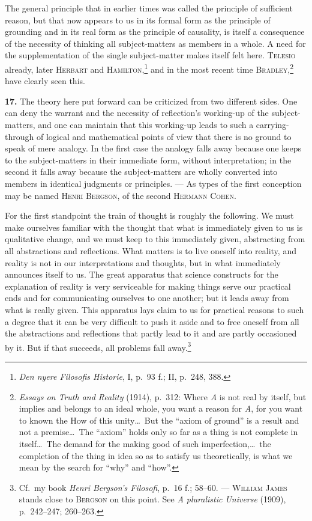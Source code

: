 \documentclass[12pt]{book}
\newcommand{\hnum}[1]{\textbf{#1.}\enspace}
\newcommand{\opage}[1]{\marginnote{\footnotesize\textit{[#1]}}}
\begin{document}
The general principle that in earlier times was called the principle of sufficient
reason, but that now appears to us in its formal form as the principle of
grounding and in its real form as the principle of causality, is itself a
consequence of the necessity of thinking all subject-matters as members in a
whole. A need for the supplementation of the single subject-matter makes itself
felt here. \textsc{Telesio} already, later \textsc{Herbart} and
\textsc{Hamilton},\footnote{\textit{Den nyere Filosofis Historie}, I, p.\ 93 f.;
II, p.\ 248, 388.} and in the most recent time
\textsc{Bradley},\footnote{\textit{Essays on Truth and Reality} (1914), p.\ 312:
Where \textit{A} is not real by itself, but implies and belongs to an ideal whole,
you want a reason for \textit{A}, for you want to known the How of this unity\dots\
But the ``axiom of ground'' is a result and not a premise\dots\ The ``axiom'' holds
only so far as a thing is not complete in itself\dots\ The demand for the making
good of such imperfection,\dots\ the completion of the thing in idea so as to
satisfy us theoretically, is what we mean by the search for ``why'' and ``how''.}
have clearly seen this.

\hnum{17} The theory here put forward can be criticized from two different sides.
One can deny the warrant and the necessity of reflection's working-up of the
subject-matters, and one can maintain that this working-up leads to such a
carrying-through of logical and mathematical points of view that there is no
ground to speak of mere analogy. In the first case the analogy falls away because
one keeps to the subject-matters in their immediate form, without interpretation;
in the second it falls away because the subject-matters are wholly converted into
members in identical judgments or principles. --- As types of the first conception
may be named \textsc{Henri Bergson}, of the second \textsc{Hermann Cohen}.

For the first standpoint the train of thought is roughly the following. We must
make ourselves familiar with the thought that what is immediately given to us is
qualitative change, and we must keep to this immediately given, abstracting from
all abstractions and reflections. What matters is to live oneself into reality,
and reality is not in our interpretations and thoughts, but in what immediately
announces itself to us. The great apparatus that science constructs for the
explanation of reality is very serviceable for making things serve our practical
\opage{46}ends and for communicating ourselves to one another; but it leads away from what
is really given. This apparatus lays claim to us for practical reasons to such a
degree that it can be very difficult to push it aside and to free oneself from all
the abstractions and reflections that partly lead to it and are partly occasioned
by it. But if that succeeds, all problems fall away.\footnote{Cf.\ my book
\textit{Henri Bergson's Filosofi}, p.\ 16 f.; 58--60. --- \textsc{William James}
stands close to \textsc{Bergson} on this point. See \textit{A pluralistic
Universe} (1909), p.\ 242--247; 260--263.}
\end{document}
